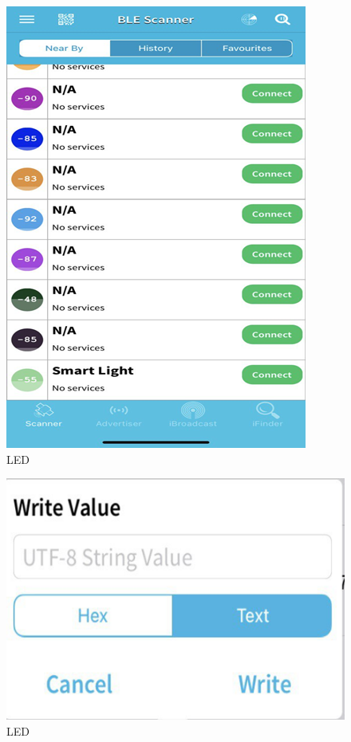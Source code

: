 \begin{figure}[htbp]
\centerline{\includegraphics{image10.png}}
\caption{LED}
\label{fig}
\end{figure}




\begin{figure}[htbp]
\centerline{\includegraphics{image11.png}}
\caption{LED}
\label{fig}
\end{figure}








